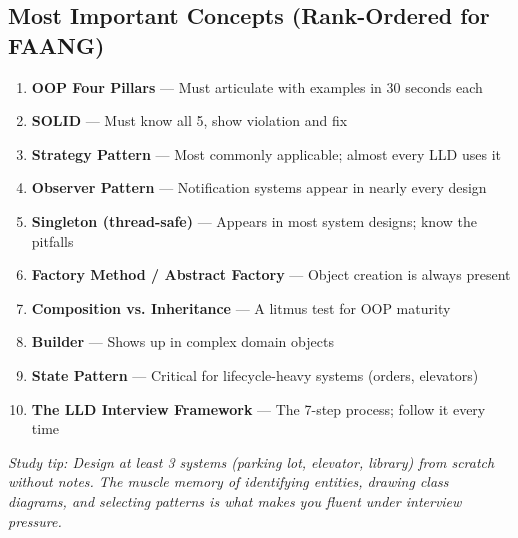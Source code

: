 \documentclass[11pt]{article}
\providecommand{\tightlist}{\setlength{\itemsep}{1pt}\setlength{\parskip}{0pt}}
\begin{document}
\subsection{Most Important Concepts (Rank-Ordered for FAANG)}\label{most-important-concepts-rank-ordered-for-faang}

\begin{enumerate}
\def\labelenumi{\arabic{enumi}.}
\tightlist
\item
  \textbf{OOP Four Pillars} --- Must articulate with examples in 30 seconds each
\item
  \textbf{SOLID} --- Must know all 5, show violation and fix
\item
  \textbf{Strategy Pattern} --- Most commonly applicable; almost every LLD uses it
\item
  \textbf{Observer Pattern} --- Notification systems appear in nearly every design
\item
  \textbf{Singleton (thread-safe)} --- Appears in most system designs; know the pitfalls
\item
  \textbf{Factory Method / Abstract Factory} --- Object creation is always present
\item
  \textbf{Composition vs. Inheritance} --- A litmus test for OOP maturity
\item
  \textbf{Builder} --- Shows up in complex domain objects
\item
  \textbf{State Pattern} --- Critical for lifecycle-heavy systems (orders, elevators)
\item
  \textbf{The LLD Interview Framework} --- The 7-step process; follow it every time
\end{enumerate}

\emph{Study tip: Design at least 3 systems (parking lot, elevator, library) from scratch without notes. The muscle memory of identifying entities, drawing class diagrams, and selecting patterns is what makes you fluent under interview pressure.}
\end{document}
